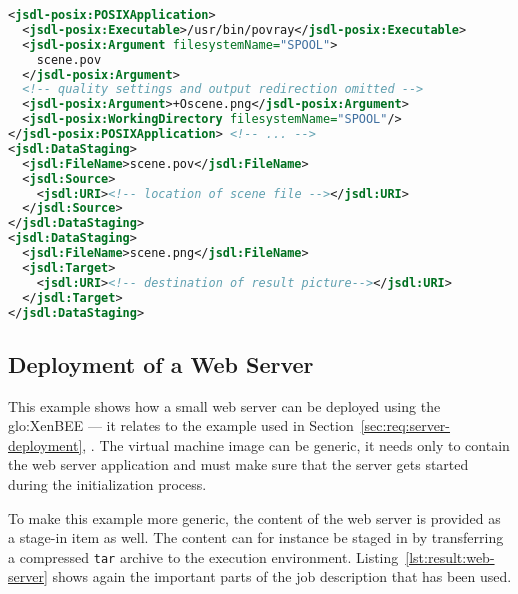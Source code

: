 \medskip
\begin{center}
  \begin{minipage}{.9\textwidth}
    \begin{lstlisting}[captionpos=b,backgroundcolor=\color{listingcolor},frame=lines,numbers=none,stepnumber=5,numberfirstline=false,numberstyle=\tiny,caption={Important
        parts from the JSDL to describe a \texttt{povray} execution (Note:
        the       listing   does not describe        a       valid       JSDL
        document).},label={lst:result:povray-cornell},language=XML]
<jsdl-posix:POSIXApplication>
  <jsdl-posix:Executable>/usr/bin/povray</jsdl-posix:Executable>
  <jsdl-posix:Argument filesystemName="SPOOL">
    scene.pov
  </jsdl-posix:Argument>
  <!-- quality settings and output redirection omitted -->
  <jsdl-posix:Argument>+Oscene.png</jsdl-posix:Argument>
  <jsdl-posix:WorkingDirectory filesystemName="SPOOL"/>
</jsdl-posix:POSIXApplication> <!-- ... -->
<jsdl:DataStaging>
  <jsdl:FileName>scene.pov</jsdl:FileName>
  <jsdl:Source>
    <jsdl:URI><!-- location of scene file --></jsdl:URI>
  </jsdl:Source>
</jsdl:DataStaging>
<jsdl:DataStaging>
  <jsdl:FileName>scene.png</jsdl:FileName>
  <jsdl:Target>
    <jsdl:URI><!-- destination of result picture--></jsdl:URI>
  </jsdl:Target>
</jsdl:DataStaging>
    \end{lstlisting}
  \end{minipage}
\end{center}

\subsection{Deployment of a Web Server}
\label{sec:deployment-of-a-web-server}

This  example shows  how a  small  web server  can be  deployed using  the
\gls{glo:XenBEE}    ---   it    relates   to    the   example    used   in
Section~\ref{sec:req:server-deployment},
.  The  virtual machine image  can be
generic, \ie it needs only to  contain the web server application and must
make sure that the server gets started during the initialization process.

To  make this  example more  generic,  the content  of the  web server  is
provided as  a stage-in  item as  well.  The content  can for  instance be
staged  in  by  transferring  a  compressed \texttt{tar}  archive  to  the
execution environment. Listing~\ref{lst:result:web-server} shows again the
important  parts  of  the  job   description  that  has  been  used.

